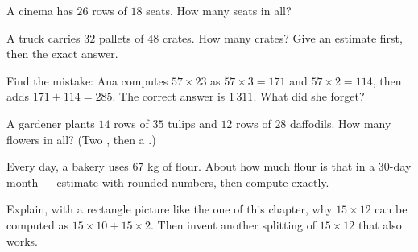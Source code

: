 \begin{exercise}[$\star$]\label{exo:g4:mult:6}
A cinema has $26$ rows of $18$ seats. How many seats in all?
\end{exercise}

\begin{exercise}[$\star$]\label{exo:g4:mult:7}
A truck carries $32$ pallets of $48$ crates. How many crates? Give
an estimate first, then the exact answer.
\end{exercise}

\begin{exercise}[$\star$]\label{exo:g4:mult:8}
Find the mistake: Ana computes $57 \times 23$ as
$57 \times 3 = 171$ and $57 \times 2 = 114$, then adds
$171 + 114 = 285$. The correct answer is $1\,311$. What did she
forget?
\end{exercise}

\begin{exercise}[$\star\star$]\label{exo:g4:mult:9}
A gardener plants $14$ rows of $35$ tulips and $12$ rows of $28$
daffodils. How many flowers in all? (Two , then a .)
\end{exercise}

\begin{exercise}[$\star\star$]\label{exo:g4:mult:10}
Every day, a bakery uses $67$ kg of flour. About how much flour is
that in a $30$-day month --- estimate with rounded numbers, then
compute exactly.
\end{exercise}

\begin{exercise}[$\star\star$]\label{exo:g4:mult:11}
Explain, with a rectangle picture like the one of this chapter, why
$15 \times 12$ can be computed as $15 \times 10 + 15 \times 2$.
Then invent another splitting of $15 \times 12$ that also works.
\end{exercise}
